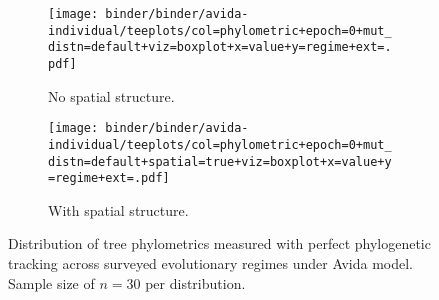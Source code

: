 \begin{figure*}
  \centering
  \begin{subfigure}[b]{\textwidth}
    \texttt{[image: binder/binder/avida-individual/teeplots/col=phylometric+epoch=0+mut\_distn=default+viz=boxplot+x=value+y=regime+ext=.pdf]}
    \caption{No spatial structure.}
  \end{subfigure}
  \begin{subfigure}[b]{\textwidth}
  \texttt{[image: binder/binder/avida-individual/teeplots/col=phylometric+epoch=0+mut\_distn=default+spatial=true+viz=boxplot+x=value+y=regime+ext=.pdf]}
    \caption{With spatial structure.}
  \end{subfigure}
  \caption{%
    Distribution of tree phylometrics measured with perfect phylogenetic tracking across surveyed evolutionary regimes under Avida model.
    Sample size of $n=30$ per distribution.
  }
  \label{fig:perfect-tree-phylometrics-avida}
\end{figure*}
